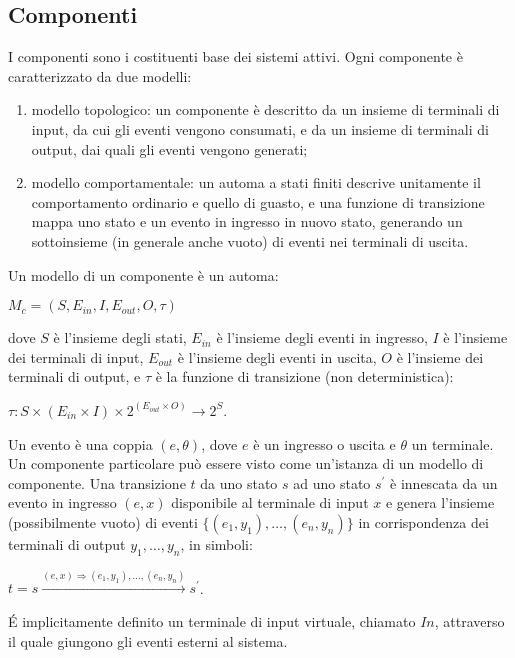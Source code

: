 \subsection{Componenti} 
I componenti sono i costituenti base dei sistemi attivi. Ogni componente è caratterizzato da due modelli:
\begin{enumerate}
\item modello topologico: un componente è descritto da un insieme di terminali di input, da cui gli eventi vengono consumati, e da un insieme di terminali di output, dai quali gli eventi vengono generati;
\item modello comportamentale: un automa a stati finiti descrive unitamente il comportamento ordinario e quello di guasto, e una funzione di transizione mappa uno stato e un evento in ingresso in nuovo stato, generando un sottoinsieme (in generale anche vuoto) di eventi nei terminali di uscita.  
\end{enumerate}

\begin{defn}
Un modello di un componente è un automa:
\begin{center}
	$M_c = (S,E_{in},I,E_{out},O,\tau)$
\end{center}
dove $S$ è l'insieme degli stati, $E_{in}$ è l'insieme degli eventi in ingresso, $I$ è l'insieme dei terminali di input, $E_{out}$ è l'insieme degli eventi in uscita, $O$ è l'insieme dei terminali di output, e $\tau$ è la funzione di transizione (non deterministica):
\begin{center}
	$ \tau : S \times (E_{in} \times I) \times 2^{(E_{out} \times O)} \rightarrow 2^S $.
\end{center}

Un evento è una coppia $(e,\theta)$, dove $e$ è un ingresso o uscita e $\theta$ un terminale. Un componente particolare può essere visto come un'istanza di un modello di componente. 
Una transizione $t$ da uno stato $s$ ad uno stato $s^\prime$ è innescata da un evento in ingresso $(e,x)$ disponibile al terminale di input $x$ e genera l'insieme (possibilmente vuoto) di eventi 
$\{(e_1,y_1), \ldots ,(e_n,y_n)\}$ in corrispondenza dei terminali di output $y_1, \ldots,y_n$, in simboli:
\begin{center}
	$t = s \xrightarrow {(e,x) \Rightarrow (e_1,y_1), \ldots ,(e_n,y_n)} s^{\prime}$.
\end{center}
\end{defn}

\'E implicitamente definito un terminale di input virtuale, chiamato $In$, attraverso il quale giungono gli eventi esterni al sistema.

